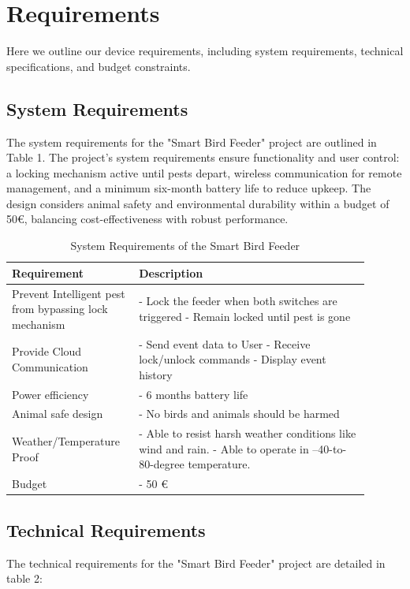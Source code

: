 \documentclass[12pt,a4paper]{article}
\begin{document}
\section{Requirements}
Here we outline our device requirements, including system requirements, technical specifications, and budget constraints.
\subsection{System Requirements}
The system requirements for the "Smart Bird Feeder" project are outlined in Table 1. The project's system requirements ensure functionality and user control: a locking mechanism active until pests depart, wireless communication for remote management, and a minimum six-month battery life to reduce upkeep. The design considers animal safety and environmental durability within a budget of 50€, balancing cost-effectiveness with robust performance.


\begin{table}[h]
\centering
\begin{tabular}{|p{0.3\linewidth}|p{0.6\linewidth}|}
\hline
\textbf{Requirement} & \textbf{Description} \\ \hline
Prevent Intelligent pest from bypassing lock mechanism & 
- Lock the feeder when both switches are triggered \newline
- Remain locked until pest is gone \\ \hline
Provide Cloud Communication & 
- Send event data to User \newline
- Receive lock/unlock commands \newline
- Display event history \\ \hline
Power efficiency & 
- 6 months battery life \\ \hline
Animal safe design & 
- No birds and animals should be harmed \\ \hline
Weather/Temperature Proof & 
- Able to resist harsh weather conditions like wind and rain. \newline
- Able to operate in –40-to-80-degree temperature. \\ \hline
Budget & 
- 50 € \\ \hline
\end{tabular}
\caption{System Requirements of the Smart Bird Feeder}
\label{tab:system_requirements}
\end{table}

\subsection{Technical Requirements}
The technical requirements for the "Smart Bird Feeder" project are detailed in table 2:
\end{document}
